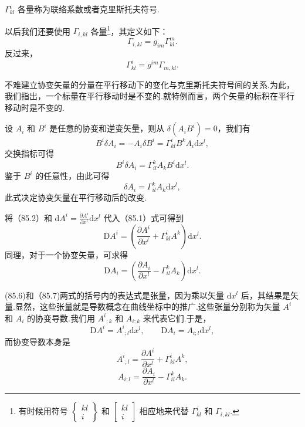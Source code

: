 $\Gamma^i_{kl}$ 各量称为联络系数或者克里斯托夫符号.

以后我们还要使用 $\Gamma_{i,kl}$ 各量\footnote{有时候用符号 $\left\{\begin{matrix}kl\\ i\end{matrix}\right\}$ 和 $\left[\begin{matrix}kl\\ i\end{matrix}\right]$ 相应地来代替 $\Gamma^i_{kl}$ 和 $\Gamma_{i,kl}$.}，其定义如下：
\begin{equation}
  \Gamma_{i,kl}=g_{im}\Gamma^m_{kl}.
\end{equation}
反过来，
\begin{equation}
  \Gamma^i_{kl}=g^{im}\Gamma_{m,kl}.
\end{equation}

不难建立协变矢量的分量在平行移动下的变化与克里斯托夫符号间的关系.为此，我们指出，一个标量在平行移动时是不变的.就特例而言，两个矢量的标积在平行移动时是不变的.

设 $A_i$ 和 $B^i$ 是任意的协变和逆变矢量，则从 $\delta(A_iB^i)=0$，我们有
\begin{equation*}
  B^i\delta A_i=-A_i\delta B^i
  =\Gamma^i_{kl}B^kA_i\mathrm{d}x^l,
\end{equation*}
交换指标可得
\begin{equation*}
  B^i\delta A_i=\Gamma^k_{il}A_kB^i\mathrm{d}x^l.
\end{equation*}
鉴于 $B^i$ 的任意性，由此可得
\begin{equation}
  \delta A_i=\Gamma^k_{il}A_k\mathrm{d}x^l,
\end{equation}
此式决定协变矢量在平行移动后的改变.

将（85.2）和 $\mathrm{d}A^i=\frac{\partial A^i}{\partial x^l}\mathrm{d}x^l$ 代入（85.1）式可得到
\begin{equation}
  \mathrm{D}A^i=\left(\frac{\partial A^i}{\partial x^l}
  +\Gamma^i_{kl}A^k\right)\mathrm{d}x^l.
\end{equation}
同理，对于一个协变矢量，可求得
\begin{equation}
  \mathrm{D}A_i=\left(\frac{\partial A_i}{\partial x^l}
  -\Gamma^k_{il}A_k\right)\mathrm{d}x^l.
\end{equation}

(85.6)和（85.7)两式的括号内的表达式是张量，因为乘以矢量 $\mathrm{d}x^l$ 后，其结果是矢量.显然，这些张量就是导数概念在曲线坐标中的推广.这些张量分别称为矢量 $A^i$ 和 $A_i$ 的协变导数.我们用 $A^i{}_{;k}$ 和 $A_{i;k}$ 来代表它们.于是，
\begin{equation}
  \mathrm{D}A^i=A^i{}_{;l}\mathrm{d}x^l,\qquad
  \mathrm{D}A_i=A_{i;l}\mathrm{d}x^l,
\end{equation}
而协变导数本身是
\begin{equation}
  A^i{}_{;l}=\frac{\partial A^i}{\partial x^l}+\Gamma^i_{kl}A^k,
\end{equation}
\begin{equation}
  A_{i;l}=\frac{\partial A_i}{\partial x^l}-\Gamma^k_{il}A_k.
\end{equation}

